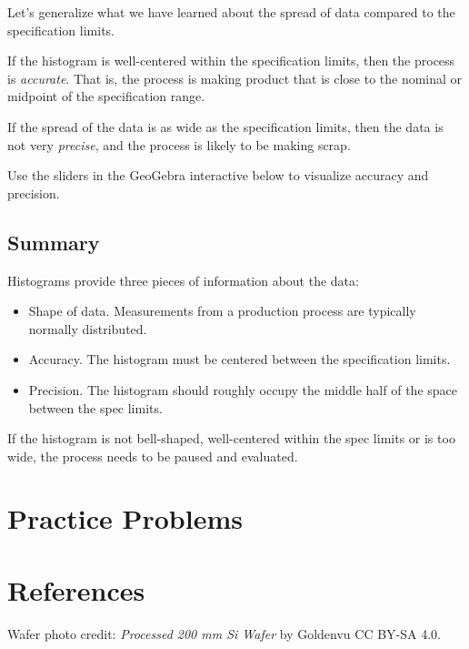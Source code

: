 \documentclass{ximera}
\begin{document}
Let's generalize what we have learned about the spread of data compared to the specification limits.

If the histogram is well-centered within the specification limits, then the process is \emph{accurate}. That is, the process is making product that is close to the nominal or midpoint of the specification range.

If the spread of the data is as wide as the specification limits, then the data is not very \emph{precise}, and the process is likely to be making scrap.

Use the sliders in the GeoGebra interactive below to visualize accuracy and precision.
\begin{onlineOnly}
\begin{center} 
\end{center}
\end{onlineOnly}

\subsection*{Summary}
Histograms provide three pieces of information about the data:
\begin{itemize}
    \item Shape of data.  Measurements from a production process are typically normally distributed.  
    \item Accuracy.  The histogram must be centered between the specification limits.  
    \item Precision.  The histogram should roughly occupy the middle half of the space between the spec limits. 
\end{itemize}
If the histogram is not bell-shaped, well-centered within the spec limits or is too wide, the process needs to be paused and evaluated.



\section*{Practice Problems}

\section*{References}
Wafer photo credit: \textit{Processed 200 mm Si Wafer} by Goldenvu CC BY-SA 4.0.
\end{document}
